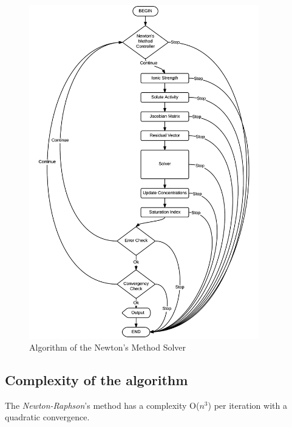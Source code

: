 \begin{figure}[ht!]
\centering
\includegraphics[width=100mm]{figures/Shpeck_algo_newton.png}
\caption{Algorithm of the Newton's Method Solver}
\label{fig:Shpeck-algo-newton}
\end{figure}
\subsection{Complexity of the algorithm}
The \emph{Newton-Raphson}'s method has a complexity O($n^3$) per iteration with a quadratic convergence.



